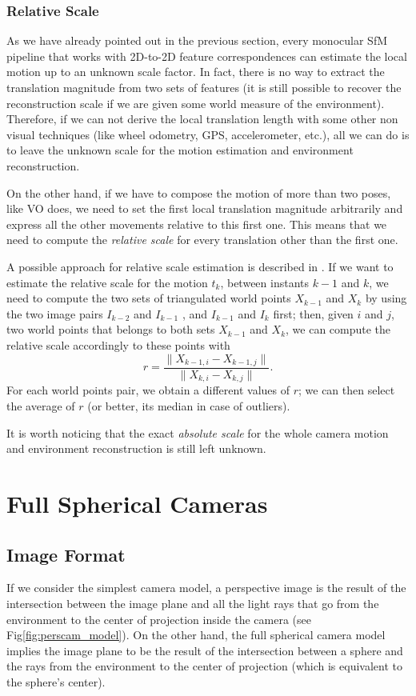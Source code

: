 \subsubsection{Relative Scale}
As we have already pointed out in the previous section, every monocular SfM 
pipeline that works with 2D-to-2D feature correspondences can estimate the 
local motion up to an unknown scale factor. In fact, there is no way to extract 
the translation magnitude from two sets of features (it is still possible 
to recover the reconstruction scale if we are given some world measure of the
environment).
Therefore, if we can not derive the local translation length with some other
non visual techniques (like wheel odometry, GPS, accelerometer, etc.), 
all we can do is to leave the unknown scale for the motion estimation and 
environment reconstruction.

On the other hand, if we have to compose the motion of more than two poses, 
like VO does, we need to set the first local translation magnitude 
arbitrarily and express all the other movements relative to this first one.
This means that we need to compute the \textit{relative scale}
for every translation other than the first one.

A possible approach for relative scale estimation is described in 
\cite{scaramuzzaVisualOdometryI}. If we want to estimate the relative scale for 
the motion $t_k$, between instants $k-1$ and $k$, we need to compute the 
two sets of triangulated world points $X_{k-1}$ and $X_{k}$ by using 
the two image pairs $I_{k-2}$ and $I_{k-1}$ , and  $I_{k-1}$ and  $I_{k}$ first; then,
given $i$ and $j$, two world points that belongs to both sets $X_{k-1}$ and 
$X_{k}$, we can compute the relative scale accordingly to these points with
\begin{equation}
	\label{eq:relative_scale}
	r = \frac{\| X_{k-1, i} - X_{k - 1, j} \|}{\| X_{k, i} - X_{k, j} \|}
	\text{.}
\end{equation}
\noindent For each world points pair, we obtain a different values of $r$;
we can then select the average of $r$ (or better, its median in case of 
outliers).

It is worth noticing that the exact \textit{absolute scale} for the whole 
camera motion and environment reconstruction is still left unknown.

\section{Full Spherical Cameras}
\subsection{Image Format}
If we consider the simplest camera model, 
a perspective image is the result of the intersection between the image plane 
and all the light rays that go from the environment to the center of 
projection inside the camera (see Fig\ref{fig:perscam_model}).
\label{fig:perscam_model}
On the other hand, the full spherical camera model implies the image plane 
to be the result of the intersection between a sphere and the rays from the 
environment to the center of projection (which is equivalent to the sphere's 
center).

